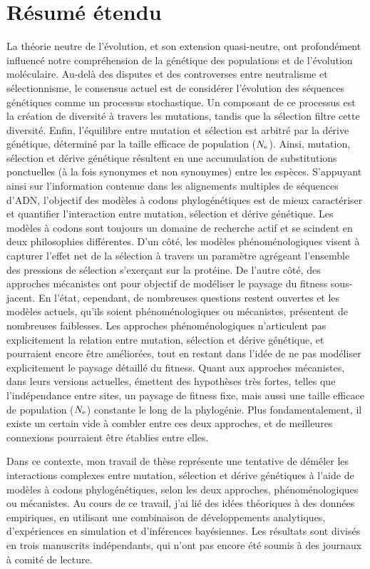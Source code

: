 \section*{Résumé étendu}

La théorie neutre de l’évolution, et son extension quasi-neutre, ont profondément influencé notre compréhension de la génétique des populations et de l'évolution moléculaire.
Au-delà des disputes et des controverses entre neutralisme et sélectionnisme, le consensus actuel est de considérer l'évolution des séquences génétiques comme un processus stochastique.
Un composant de ce processus est la création de diversité à travers les mutations, tandis que la sélection filtre cette diversité.
Enfin, l'équilibre entre mutation et sélection est arbitré par la dérive génétique, déterminé par la taille efficace de population ($N_{\textrm{e}}$).
Ainsi, mutation, sélection et dérive génétique résultent en une accumulation de substitutions ponctuelles (à la fois synonymes et non synonymes) entre les espèces.
S'appuyant ainsi sur l'information contenue dans les alignements multiples de séquences d'ADN, l'objectif des modèles à codons phylogénétiques est de mieux caractériser et quantifier l'interaction entre mutation, sélection et dérive génétique.
Les modèles à codons sont toujours un domaine de recherche actif et se scindent en deux philosophies différentes.
D'un côté, les modèles phénoménologiques visent à capturer l'effet net de la sélection à travers un paramètre agrégeant l’ensemble des pressions de sélection s’exerçant sur la protéine.
De l'autre côté, des approches mécanistes ont pour objectif de modéliser le paysage du fitness sous-jacent.
En l'état, cependant, de nombreuses questions restent ouvertes et les modèles actuels, qu'ils soient phénoménologiques ou mécanistes, présentent de nombreuses faiblesses.
Les approches phénoménologiques n'articulent pas explicitement la relation entre mutation, sélection et dérive génétique, et pourraient encore être améliorées, tout en restant dans l'idée de ne pas modéliser explicitement le paysage détaillé du fitness.
Quant aux approches mécanistes, dans leurs versions actuelles, émettent des hypothèses très fortes, telles que l'indépendance entre sites, un paysage de fitness fixe, mais aussi une taille efficace de population ($N_{\textrm{e}}$) constante le long de la phylogénie.
Plus fondamentalement, il existe un certain vide à combler entre ces deux approches, et de meilleures connexions pourraient être établies entre elles.

Dans ce contexte, mon travail de thèse représente une tentative de démêler les interactions complexes entre mutation, sélection et dérive génétiques à l'aide de modèles à codons phylogénétiques, selon les deux approches, phénoménologiques ou mécanistes.
Au cours de ce travail, j'ai lié des idées théoriques à des données empiriques, en utilisant une combinaison de développements analytiques, d'expériences en simulation et d'inférences bayésiennes.
Les résultats sont divisés en trois manuscrits indépendants, qui n'ont pas encore été soumis à des journaux à comité de lecture.


